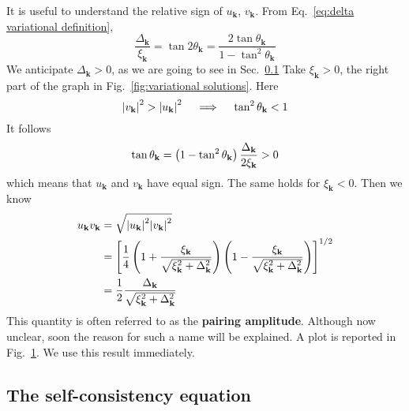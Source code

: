 It is useful to understand the relative sign of $u_\mathbf{k}$, $v_\mathbf{k}$. From Eq.~\eqref{eq:delta variational definition},
\[
	\frac{\Delta_\mathbf{k}}{\xi_\mathbf{k}} = \tan 2\theta_\mathbf{k} = \frac{2 \tan\theta_\mathbf{k}}{1 - \tan^2\theta_\mathbf{k}}
\]
We anticipate $\Delta_\mathbf{k} > 0$, as we are going to see in Sec.~\ref{subsec:the self consistency equation} Take $\xi_\mathbf{k}>0$, the right part of the graph in Fig.~\ref{fig:variational solutions}. Here
\[
	\abs{v_\mathbf{k}}^2 > \abs{u_\mathbf{k}}^2
	\quad\implies\quad
	\tan^2\theta_\mathbf{k} < 1
\]
It follows
\[
	\tan\theta_\mathbf{k} = \left({1-\tan^2\theta_\mathbf{k}}\right) \frac{\Delta_\mathbf{k}}{2\xi_\mathbf{k}} > 0
\]
which means that $u_\mathbf{k}$ and $v_\mathbf{k}$ have equal sign. The same holds for $\xi_\mathbf{k}<0$. Then we know
\begin{align}
	u_\mathbf{k} v_\mathbf{k} &= \sqrt{\abs{u_\mathbf{k}}^2 \abs{v_\mathbf{k}}^2} \nonumber \\
	&= \left[{\frac{1}{4} \left({1 + \frac{\xi_\mathbf{k}}{\sqrt{\xi_\mathbf{k}^2 + \Delta_\mathbf{k}^2}}}\right) \left({1 - \frac{\xi_\mathbf{k}}{\sqrt{\xi_\mathbf{k}^2 + \Delta_\mathbf{k}^2}}}\right) }\right]^{1/2} \nonumber \\
	&= \frac{1}{2} \frac{\Delta_\mathbf{k}}{\sqrt{\xi_\mathbf{k}^2 + \Delta_\mathbf{k}^2}} \label{eq:pairing amplitude vk uk}
\end{align}
This quantity is often referred to as the \textbf{pairing amplitude}. Although now unclear, soon the reason for such a name will be explained. A plot is reported in Fig.~\ref{fig:variational solutions pairing amplitude}.
We use this result immediately.

\begin{figure}
	\centering
	
	\caption{}
	\label{fig:variational solutions pairing amplitude}
\end{figure}


\subsection{The self-consistency equation}\label{subsec:the self consistency equation}

